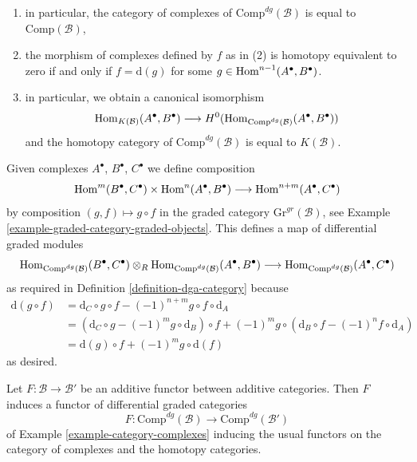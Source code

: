 \begin{example}
\begin{enumerate}
is actually a map of complexes,
\item in particular, the category of complexes of
$\text{Comp}^{dg}(\mathcal{B})$ is equal to $\text{Comp}(\mathcal{B})$,
\item the morphism of complexes defined by $f$ as in (2)
is homotopy equivalent to zero if and only if $f = \text{d}(g)$
for some $g \in \mathop{\mathrm{Hom}}\nolimits^{n - 1}(A^\bullet, B^\bullet)$.
\item in particular, we obtain a canonical isomorphism
$$
\mathop{\mathrm{Hom}}\nolimits_{K(\mathcal{B})}(A^\bullet, B^\bullet)
\longrightarrow
H^0(\mathop{\mathrm{Hom}}\nolimits_{\text{Comp}^{dg}(\mathcal{B})}(A^\bullet, B^\bullet))
$$
and the homotopy category of $\text{Comp}^{dg}(\mathcal{B})$ is equal to
$K(\mathcal{B})$.
\end{enumerate}
Given complexes $A^\bullet$, $B^\bullet$, $C^\bullet$ we define
composition
$$
\mathop{\mathrm{Hom}}\nolimits^m(B^\bullet, C^\bullet) \times \mathop{\mathrm{Hom}}\nolimits^n(A^\bullet, B^\bullet)
\longrightarrow
\mathop{\mathrm{Hom}}\nolimits^{n + m}(A^\bullet, C^\bullet)
$$
by composition $(g, f) \mapsto g \circ f$ in the graded category
$\text{Gr}^{gr}(\mathcal{B})$, see
Example \ref{example-graded-category-graded-objects}.
This defines a map of differential graded modules
$$
\mathop{\mathrm{Hom}}\nolimits_{\text{Comp}^{dg}(\mathcal{B})}(B^\bullet, C^\bullet)
\otimes_R
\mathop{\mathrm{Hom}}\nolimits_{\text{Comp}^{dg}(\mathcal{B})}(A^\bullet, B^\bullet)
\longrightarrow
\mathop{\mathrm{Hom}}\nolimits_{\text{Comp}^{dg}(\mathcal{B})}(A^\bullet, C^\bullet)
$$
as required in Definition \ref{definition-dga-category}
because
\begin{align*}
\text{d}(g \circ f) & =
\text{d}_C \circ g \circ f - (-1)^{n + m} g \circ f \circ \text{d}_A \\
& =
\left(\text{d}_C \circ g - (-1)^m g \circ \text{d}_B\right) \circ f +
(-1)^m g \circ \left(\text{d}_B \circ f - (-1)^n f \circ \text{d}_A\right) \\
& =
\text{d}(g) \circ f + (-1)^m g \circ \text{d}(f)
\end{align*}
as desired.
\end{example}

\begin{lemma}
\label{lemma-additive-functor-induces-dga-functor}
Let $F : \mathcal{B} \to \mathcal{B}'$ be an additive functor between
additive categories. Then $F$ induces a functor of differential
graded categories
$$
F : \text{Comp}^{dg}(\mathcal{B}) \to \text{Comp}^{dg}(\mathcal{B}')
$$
of Example \ref{example-category-complexes}
inducing the usual functors on the category of complexes and the
homotopy categories.
\end{lemma}


